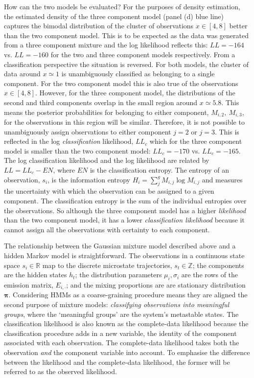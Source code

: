 How can the two models be evaluated?  For the purposes of density estimation, the estimated density of the three component model (panel (d) blue line) captures the bimodal distribution of the cluster of observations $x \in [4, 8]$ better than the two component model. This is to be expected as the data was generated from a three component mixture and the log likelihood reflects this: $LL=\num{-164}$ vs. $LL=\num{-160}$ for the two and three component models respectively. From a classification perspective the situation is reversed. For both models, the cluster of data around $x\simeq 1$ is unambiguously classified as belonging to a single component. For the two component model this is also true of the observations $x  \in [4, 8]$. However, for the three component model, the  distributions of the second and third components overlap in the small region around $x\simeq 5.8$. This means the posterior probabilities for belonging to either component, $M_{i, 2},\ M_{i, 3}$,  for the observations in this region will be similar. Therefore, it is not possible to unambiguously assign observations to either component $j=2$ or $j=3$. This is reflected in the log \emph{classification} likelihood, $LL_{c}$ which for the three component model is smaller than the two component model: $LL_{c}=\num{-170}$ vs. $LL_{c} = \num{-165}$. The log classification likelihood and the log likelihood are related by $LL = LL_{c} - EN$, where $EN$ is the classification entropy\cite{hathaway1986another}.  The entropy of an observation, $s_i$, is the information entropy  $H_i = \sum_{j}^{g}M_{i,j}\log{M_{i,j}}$  and measures the uncertainty with which the observation can be assigned to a given component.\cite{mackay2003information} The classification entropy is the sum of the individual entropies over the observations\cite{mclachlanFiniteMixtureModels2000}. So although the three component model has a higher \emph{likelihood} than the two component model, it has a lower \emph{classification likelihood} because it cannot assign all the observations with certainty to each component. 

The relationship between the Gaussian mixture model described above and a hidden Markov model is straightforward. The observations in a continuous state space $s_{i} \in \mathbb{R}$ map to the discrete microstate trajectories, $s_{t} \in \mathbb{Z}$; the components are the hidden states $h_{t}$; the distribution parameters $\mu_{i}, \sigma_{i}$ are the rows of the emission matrix, $E_{i, \cdot}$; and the mixing proportions are are stationary distribution $\bm{\pi}$. Considering HMMs as a coarse-graining procedure means they are aligned the second purpose of mixture models: \emph{classifying observations into meaningful groups}, where the `meaningful groups' are the system's metastable states. The classification likelihood is also known as the complete-data likelihood because the classification procedure adds in a new variable, the identity of the component associated with each observation. The complete-data likelihood takes both the observation \emph{and} the component variable into account\cite{mclachlan1988mixture}. To emphasise the difference between the likelihood and the complete-data likelihood, the former will be referred to as the observed likelihood.  

